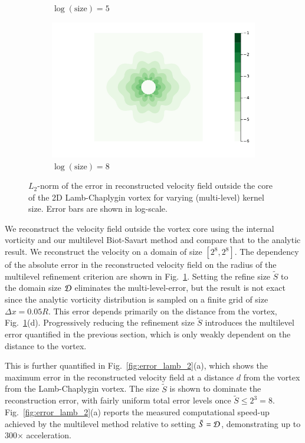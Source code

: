\documentclass[preprint,12pt]{elsarticle}
\begin{document}
\begin{figure}
\begin{subfigure}{.5\textwidth}
  \caption{$\log(\text{size})=5$}
\end{subfigure}%
\begin{subfigure}{.5\textwidth}
  \centering
  \includegraphics[width=\linewidth]{tex/fig/lamb_dipole_error_dist128.png}
  \caption{$\log(\text{size})=8$}
\end{subfigure}
\caption{$L_2$-norm of the error in reconstructed velocity field outside the core of the 2D Lamb-Chaplygin vortex for varying (multi-level) kernel size. Error bars are shown in log-scale.}
\label{fig:lam_error_dist}
\end{figure}

We reconstruct the velocity field outside the vortex core using the internal vorticity and our multilevel Biot-Savart method and compare that to the analytic result. We reconstruct the velocity on a domain of size $[2^8,2^8]$. The dependency of the absolute error in the reconstructed velocity field on the radius of the multilevel refinement criterion are shown in Fig.~\ref{fig:lam_error_dist}. Setting the refine size $\tilde{S}$ to the domain size $\cal D$ eliminates the multi-level-error, but the result is not exact since the analytic vorticity distribution is sampled on a finite grid of size $\Delta x=0.05
R$. This error depends primarily on the distance from the vortex, Fig.~\ref{fig:lam_error_dist}(d). Progressively reducing the refinement size $\tilde{S}$ introduces the multilevel error quantified in the previous section, which is only weakly dependent on the distance to the vortex.

This is further quantified in Fig.~\ref{fig:error_lamb_2}(a), which shows the maximum error in the reconstructed velocity field at a distance $d$ from the vortex from the Lamb-Chaplygin vortex. The size $\tilde{S}$ is shown to dominate the reconstruction error, with fairly uniform total error levels once $\tilde{S} \le 2^3 = 8$. Fig.~\ref{fig:error_lamb_2}(a) reports the measured computational speed-up achieved by the multilevel method relative to setting $\tilde{S}=\cal D$, demonstrating up to 300$\times$ acceleration.
\end{document}
